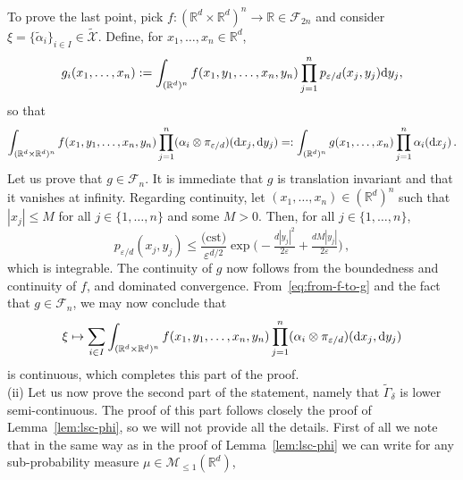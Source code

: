 \documentclass[a4paper,11pt]{amsart}
\numberwithin{equation}{section}
\newcommand{\bbR}{{\ensuremath{\mathbb R}} }
\newcommand{\cF}{{\ensuremath{\mathcal F}} }
\newcommand{\cM}{{\ensuremath{\mathcal M}} }
\newcommand{\cX}{{\ensuremath{\mathcal X}} }
\newcommand{\gd}{\delta}
\newcommand{\gep}{\varepsilon}
\renewcommand{\tilde}{\widetilde}          %
\newcommand{\dd}{\text{\rm d}}             %
\newcommand{\R}{\mathbb{R}}
\newcommand{\8}{\infty}
\newcommand{\beq}{\begin{equation}}
\newcommand{\eeq}{\end{equation}}
\begin{document}
	To prove the last point, pick $f\colon (\bbR^d\times \bbR^d)^n\to \bbR\in \cF_{2n}$ and consider $\xi=\{\tilde\alpha_i\}_{i\in I}\in \tilde\cX$. 
Define, for $x_1,\ldots, x_n \in \bbR^d$,
\beq
g_i(x_1,\ldots, x_n) := \int_{(\R^d)^n}f(x_1, y_1,\ldots, x_n,y_n)\prod_{j=1}^np_{ \gep/d}(x_j,y_j)\dd y_j,
\eeq	
so that
	\beq\label{eq:from-f-to-g}
	\int_{(\R^d\times\R^d)^n} f(x_1, y_1,\ldots, x_n,y_n) \prod_{j=1}^n(\alpha_i\otimes \pi_{ \gep/d})(\dd x_j, \dd y_j)
	=: \int_{(\R^d)^n}g(x_1,\ldots, x_n)\prod_{j=1}^n\alpha_i(\dd x_j)\,.
	\eeq
Let us prove that $g\in\cF_n$. It is immediate that $g$ is translation invariant and that it vanishes at infinity. Regarding continuity, let $(x_1,\ldots, x_n)\in (\R^d)^n$ such that $|x_j|\leq M$ for all $j\in\{1,\ldots,n\}$ and some $M>0$. Then, for all $j\in\{1,\ldots,n\}$,
	\beq
	p_{ \gep/d}(x_j,y_j)\le \frac{\textrm{(cst)}}{\gep^{d/2}}\exp\Big(-\tfrac{{ d}|y_j|^2}{2\gep}+ \tfrac{{ d}M|y_j|}{2\gep}\Big)\,,
	\eeq
	which is integrable. The continuity of $g$ now follows from the boundedness and continuity of $f$, and dominated convergence. From~\eqref{eq:from-f-to-g} and the fact that $g\in\cF_n$, we may now conclude that
	\beq
	\xi\mapsto \sum_{i\in I} \int_{(\R^d\times\R^d)^n}f(x_1,y_1,\ldots, x_n,y_n)\prod_{j=1}^n(\alpha_i\otimes \pi_{ \gep/d})(\dd x_j, \dd y_j)
	\eeq
	is continuous, which completes this part of the proof.\\

	(ii) Let us now prove the second part of the statement, namely that $\tilde\Gamma_\gd$ is lower semi-continuous.
	The proof of this part follows closely the proof of Lemma~\ref{lem:lsc-phi}, so we will not provide all the details. First of all we note that in the same way as in the proof of Lemma~\ref{lem:lsc-phi} we can write for any sub-probability measure $\mu\in\cM_{\leq 1}(\R^d)$,
\end{document}
